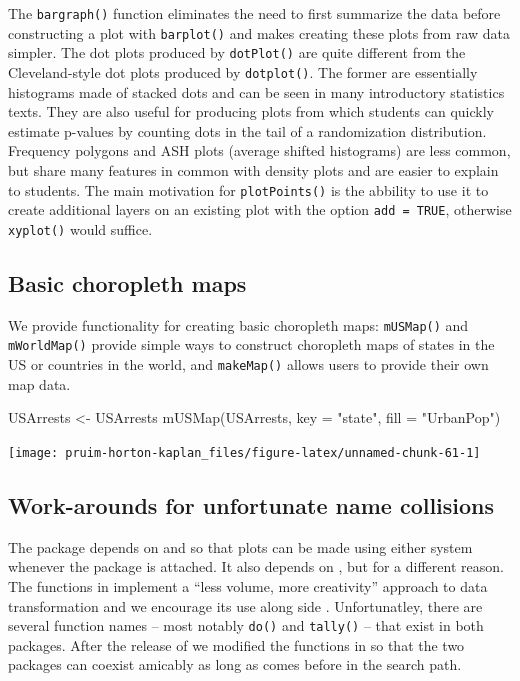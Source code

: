 The \texttt{bargraph()} function eliminates the need to first summarize
the data before constructing a plot with \texttt{barplot()} and makes
creating these plots from raw data simpler. The dot plots produced by
\texttt{dotPlot()} are quite different from the Cleveland-style dot
plots produced by \texttt{dotplot()}. The former are essentially
histograms made of stacked dots and can be seen in many introductory
statistics texts. They are also useful for producing plots from which
students can quickly estimate p-values by counting dots in the tail of a
randomization distribution. Frequency polygons and ASH plots (average
shifted histograms) are less common, but share many features in common
with density plots and are easier to explain to students. The main
motivation for \texttt{plotPoints()} is the abbility to use it to create
additional layers on an existing plot with the option
\texttt{add\ =\ TRUE}, otherwise \texttt{xyplot()} would suffice.

\subsection{Basic choropleth maps}\label{basic-choropleth-maps}

We provide functionality for creating basic choropleth maps:
\texttt{mUSMap()} and \texttt{mWorldMap()} provide simple ways to
construct choropleth maps of states in the US or countries in the world,
and \texttt{makeMap()} allows users to provide their own map data.

\begin{Schunk}
\begin{Sinput}
USArrests <- USArrests %
mUSMap(USArrests, key = "state", fill = "UrbanPop")
\end{Sinput}


\begin{center}\texttt{[image: pruim-horton-kaplan\_files/figure-latex/unnamed-chunk-61-1]} \end{center}

\end{Schunk}

\subsection{Work-arounds for unfortunate name
collisions}\label{work-arounds-for-unfortunate-name-collisions}

The  package depends on  and  so
that plots can be made using either system whenever the 
package is attached. It also depends on  \citep{dplyr},
but for a different reason. The functions in  implement a
``less volume, more creativity'' approach to data transformation and we
encourage its use along side . Unfortunatley, there are
several function names -- most notably \texttt{do()} and
\texttt{tally()} -- that exist in both packages. After the release of
 we modified the functions in  so that the two
packages can coexist amicably as long as  comes before
 in the search path.

